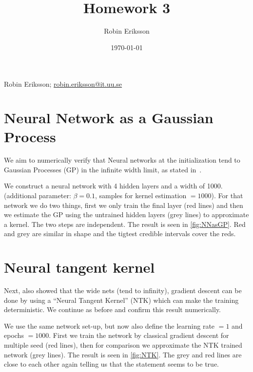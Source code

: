 \documentclass{amsart}
\numberwithin{equation}{section}
\numberwithin{table}{section}
\numberwithin{figure}{section}
\theoremstyle{plain}
\theoremstyle{definition}
\theoremstyle{remark}
\begin{document}
\title[]{Homework 3}

\author[R. Eriksson]{Robin Eriksson}



\date{\today}


Robin Eriksson; \href{mailto:robin.eriksson@it.uu.se}{robin.eriksson@it.uu.se}
\section{Neural Network as a Gaussian Process}\label{sec:gp}
We aim to numerically verify that Neural networks at the
initialization tend to Gaussian Processes (GP) in the infinite width
limit, as stated in~\cite{NEURIPS2018_5a4be1fa}.

We construct a neural network with 4 hidden layers and a width of
1000.  (additional parameter: $\beta = 0.1$, samples for kernel
estimation $= 1000$). For that network we do two things, first we only
train the final layer (red lines) and then we estimate the GP using
the untrained hidden layers (grey lines) to approximate a kernel. The two steps are
independent. The result is seen in \ref{fig:NNasGP}. Red and grey are
similar in shape and the tigtest credible intervals cover the reds.


\section{Neural tangent kernel}\label{sec:ntk}
Next, \cite{NEURIPS2018_5a4be1fa} also showed that the wide nets (tend
to infinity), gradient descent can be done by using a ``Neural Tangent
Kernel'' (NTK) which can make the training deterministic. We continue as
before and confirm this result numerically.

We use the same network set-up, but now also define the learning rate
$= 1$ and epochs $= 1000$. First we train the network by classical
gradient descent for multiple seed (red lines), then for comparison we
approximate the NTK trained network (grey lines). The result is seen
in \ref{fig:NTK}. The grey and red lines are close to each other again
telling us that the statement seems to be true.
\end{document}
